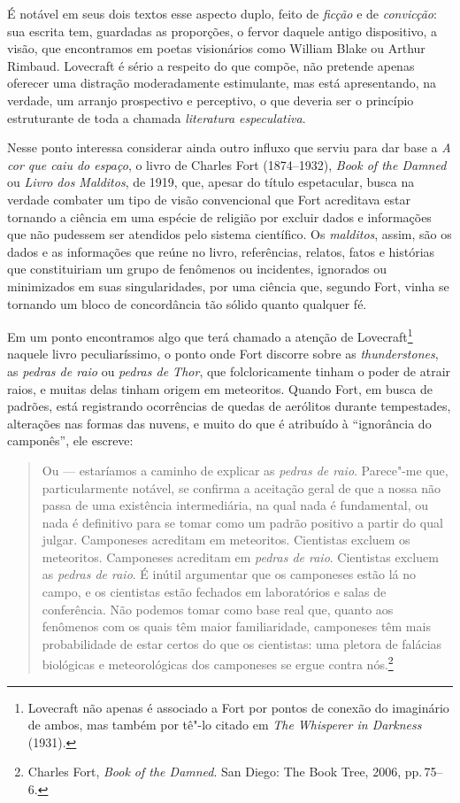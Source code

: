 É notável em seus dois textos esse aspecto duplo, feito de \textit{ficção}
e de \textit{convicção}: sua escrita tem, guardadas as proporções, o
fervor daquele antigo dispositivo, a visão, que encontramos em poetas
visionários como William Blake ou Arthur Rimbaud. Lovecraft é sério a
respeito do que compõe, não pretende apenas oferecer uma distração
moderadamente estimulante, mas está apresentando, na verdade, um arranjo
prospectivo e perceptivo, o que deveria ser o princípio estruturante de
toda a chamada \textit{literatura especulativa}.

Nesse ponto interessa considerar ainda outro influxo que serviu para dar
base a \textit{A cor que caiu do espaço}, o livro de Charles Fort
(1874--1932), \textit{Book of the Damned} ou \textit{Livro dos Malditos}, de 1919, que,
apesar do título espetacular, busca na verdade combater um tipo de visão
convencional que Fort acreditava estar tornando a ciência em uma espécie
de religião por excluir dados e informações que não pudessem ser
atendidos pelo sistema científico. Os \textit{malditos}, assim, são os dados
e as informações que reúne no livro, referências, relatos, fatos e
histórias que constituiriam um grupo de fenômenos ou incidentes,
ignorados ou minimizados em suas singularidades, por uma ciência que,
segundo Fort, vinha se tornando um bloco de concordância tão sólido
quanto qualquer fé.

Em um ponto encontramos algo que terá chamado a atenção de
Lovecraft\footnote{Lovecraft não apenas é associado a Fort por pontos de
  conexão do imaginário de ambos, mas também por tê"-lo citado em \textit{The
  Whisperer in Darkness} (1931).} naquele livro peculiaríssimo, o ponto
onde Fort discorre sobre as \textit{thunderstones}, as \textit{pedras de raio} ou
\textit{pedras de Thor}, que folcloricamente tinham o poder de atrair raios,
e muitas delas tinham origem em meteoritos. Quando Fort, em busca de
padrões, está registrando ocorrências de quedas de aerólitos durante
tempestades, alterações nas formas das nuvens, e muito do que é
atribuído à ``ignorância do camponês'', ele escreve:

\begin{quote}
Ou --- estaríamos a caminho de explicar as \textit{pedras de raio}. Parece"-me
que, particularmente notável, se confirma a aceitação geral de que a
nossa não passa de uma existência intermediária, na qual nada é
fundamental, ou nada é definitivo para se tomar como um padrão positivo
a partir do qual julgar. Camponeses acreditam em meteoritos. Cientistas
excluem os meteoritos. Camponeses acreditam em \textit{pedras de raio}.
Cientistas excluem as \textit{pedras de raio}. É inútil argumentar que os
camponeses estão lá no campo, e os cientistas estão fechados em
laboratórios e salas de conferência. Não podemos tomar como base real
que, quanto aos fenômenos com os quais têm maior familiaridade,
camponeses têm mais probabilidade de estar certos do que os cientistas:
uma pletora de falácias biológicas e meteorológicas dos camponeses se
ergue contra nós.\footnote{Charles Fort, \textit{Book of the Damned}. San
  Diego: The Book Tree, 2006, pp.\,75--6.}
\end{quote}

